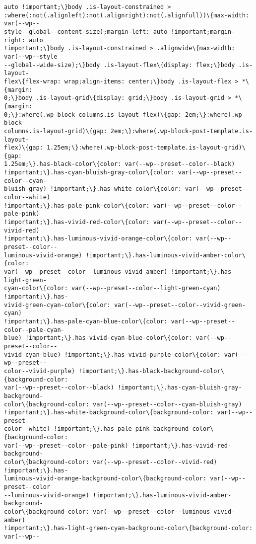 \documentclass[11pt]{article}
\begin{document}
\begin{Verbatim}[commandchars=\\\{\}]
auto !important;\}body .is-layout-constrained >
:where(:not(.alignleft):not(.alignright):not(.alignfull))\{max-width: var(--wp--
style--global--content-size);margin-left: auto !important;margin-right: auto
!important;\}body .is-layout-constrained > .alignwide\{max-width: var(--wp--style
--global--wide-size);\}body .is-layout-flex\{display: flex;\}body .is-layout-
flex\{flex-wrap: wrap;align-items: center;\}body .is-layout-flex > *\{margin:
0;\}body .is-layout-grid\{display: grid;\}body .is-layout-grid > *\{margin:
0;\}:where(.wp-block-columns.is-layout-flex)\{gap: 2em;\}:where(.wp-block-
columns.is-layout-grid)\{gap: 2em;\}:where(.wp-block-post-template.is-layout-
flex)\{gap: 1.25em;\}:where(.wp-block-post-template.is-layout-grid)\{gap:
1.25em;\}.has-black-color\{color: var(--wp--preset--color--black)
!important;\}.has-cyan-bluish-gray-color\{color: var(--wp--preset--color--cyan-
bluish-gray) !important;\}.has-white-color\{color: var(--wp--preset--color--white)
!important;\}.has-pale-pink-color\{color: var(--wp--preset--color--pale-pink)
!important;\}.has-vivid-red-color\{color: var(--wp--preset--color--vivid-red)
!important;\}.has-luminous-vivid-orange-color\{color: var(--wp--preset--color--
luminous-vivid-orange) !important;\}.has-luminous-vivid-amber-color\{color:
var(--wp--preset--color--luminous-vivid-amber) !important;\}.has-light-green-
cyan-color\{color: var(--wp--preset--color--light-green-cyan) !important;\}.has-
vivid-green-cyan-color\{color: var(--wp--preset--color--vivid-green-cyan)
!important;\}.has-pale-cyan-blue-color\{color: var(--wp--preset--color--pale-cyan-
blue) !important;\}.has-vivid-cyan-blue-color\{color: var(--wp--preset--color--
vivid-cyan-blue) !important;\}.has-vivid-purple-color\{color: var(--wp--preset--
color--vivid-purple) !important;\}.has-black-background-color\{background-color:
var(--wp--preset--color--black) !important;\}.has-cyan-bluish-gray-background-
color\{background-color: var(--wp--preset--color--cyan-bluish-gray)
!important;\}.has-white-background-color\{background-color: var(--wp--preset--
color--white) !important;\}.has-pale-pink-background-color\{background-color:
var(--wp--preset--color--pale-pink) !important;\}.has-vivid-red-background-
color\{background-color: var(--wp--preset--color--vivid-red) !important;\}.has-
luminous-vivid-orange-background-color\{background-color: var(--wp--preset--color
--luminous-vivid-orange) !important;\}.has-luminous-vivid-amber-background-
color\{background-color: var(--wp--preset--color--luminous-vivid-amber)
!important;\}.has-light-green-cyan-background-color\{background-color: var(--wp--

\end{Verbatim}
\end{document}
